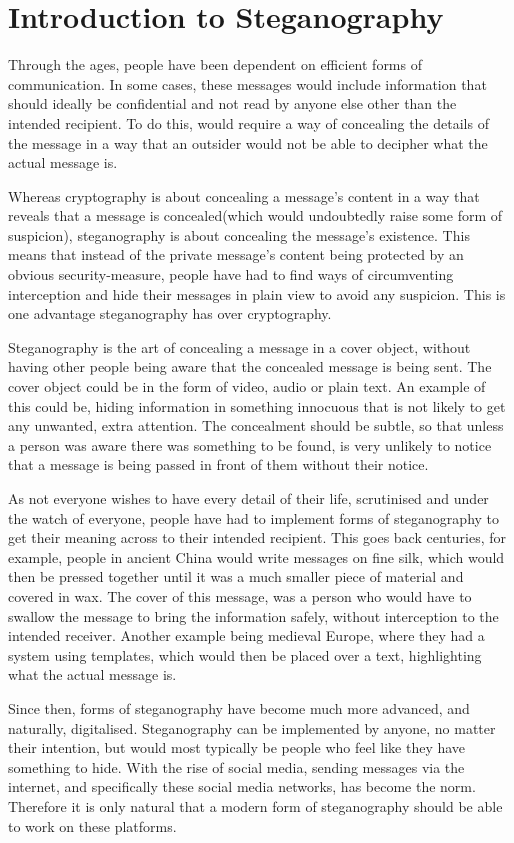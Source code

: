 \section{Introduction to Steganography}
Through the ages, people have been dependent on efficient forms of communication. In some cases, these messages would include information that should ideally be confidential and not read by anyone else other than the intended recipient. To do this, would require a way of concealing the details of the message in a way that an outsider would not be able to decipher what the actual message is.

Whereas cryptography is about concealing a message's content in a way that reveals that a message is concealed(which would undoubtedly raise some form of suspicion), steganography is about concealing the message's existence. This means that instead of the private message's content being protected by an obvious security-measure, people have had to find ways of circumventing interception and hide their messages in plain view to avoid any suspicion. This is one advantage steganography has over cryptography. 

Steganography is the art of concealing a message in a cover object, without having other people being aware that the concealed message is being sent.\cite{Anderson1998} The cover object could be in the form of video, audio or plain text. An example of this could be, hiding information in something innocuous that is not likely to get any unwanted, extra attention. The concealment should be subtle, so that unless a person was aware there was something to be found, is very unlikely to notice that a message is being passed in front of them without their notice.

As not everyone wishes to have every detail of their life, scrutinised and under the watch of everyone, people have had to implement forms of steganography to get their meaning across to their intended recipient. This goes back centuries, for example, people in ancient China would write messages on fine silk, which would then be pressed together until it was a much smaller piece of material and covered in wax. The cover of this message, was a person who would have to swallow the message to bring the information safely, without interception to the intended receiver. \cite{Singh2001} Another example being medieval Europe, where they had a system using templates, which would then be placed over a text, highlighting what the actual message is.\cite{Anderson1998}

Since then, forms of steganography have become much more advanced, and naturally, digitalised. Steganography can be implemented by anyone, no matter their intention, but would most typically be people who feel like they have something to hide. With the rise of social media, sending messages via the internet, and specifically these social media networks, has become the norm. Therefore it is only natural that a modern form of steganography should be able to work on these platforms. 
